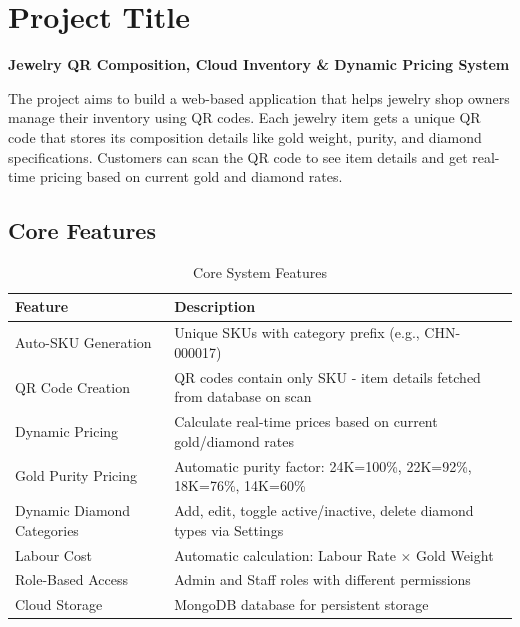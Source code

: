 \documentclass[12pt,a4paper]{article}
\begin{document}
\section{Project Title}

\textbf{\Large Jewelry QR Composition, Cloud Inventory \& Dynamic Pricing System}

\vspace{0.5cm}

The project aims to build a web-based application that helps jewelry shop owners manage their inventory using QR codes. Each jewelry item gets a unique QR code that stores its composition details like gold weight, purity, and diamond specifications. Customers can scan the QR code to see item details and get real-time pricing based on current gold and diamond rates.

\subsection{Core Features}

\begin{table}[H]
\centering
\begin{tabular}{|p{4cm}|p{10cm}|}
\hline
\textbf{Feature} & \textbf{Description} \\
\hline
Auto-SKU Generation & Unique SKUs with category prefix (e.g., CHN-000017) \\
\hline
QR Code Creation & QR codes contain only SKU - item details fetched from database on scan \\
\hline
Dynamic Pricing & Calculate real-time prices based on current gold/diamond rates \\
\hline
Gold Purity Pricing & Automatic purity factor: 24K=100\%, 22K=92\%, 18K=76\%, 14K=60\% \\
\hline
Dynamic Diamond Categories & Add, edit, toggle active/inactive, delete diamond types via Settings \\
\hline
Labour Cost & Automatic calculation: Labour Rate $\times$ Gold Weight \\
\hline
Role-Based Access & Admin and Staff roles with different permissions \\
\hline
Cloud Storage & MongoDB database for persistent storage \\
\hline
\end{tabular}
\caption{Core System Features}
\end{table}

\end{document}
